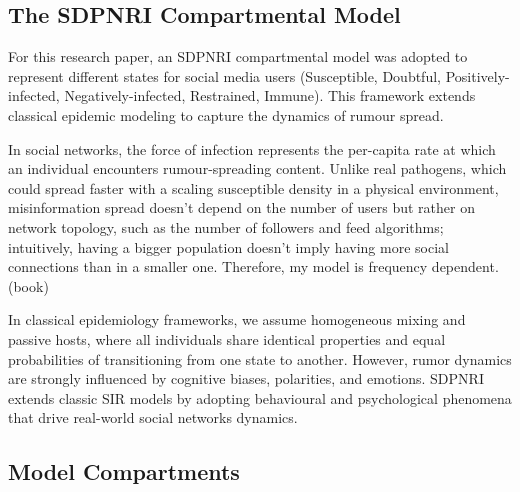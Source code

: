 \documentclass[11pt]{article}
\begin{document}
\subsection{The SDPNRI Compartmental Model}

For this research paper, an SDPNRI compartmental model was adopted to represent
different states for social media users (Susceptible, Doubtful, Positively-infected,
Negatively-infected, Restrained, Immune). This framework extends classical epidemic
modeling to capture the dynamics of rumour spread.

In social networks, the force of infection represents the per-capita rate at which an
individual encounters rumour-spreading content. Unlike real pathogens, which could
spread faster with a scaling susceptible density in a physical environment,
misinformation spread doesn't depend on the number of users but rather on network
topology, such as the number of followers and feed algorithms; intuitively, having a
bigger population doesn't imply having more social connections than in a smaller one.
Therefore, my model is frequency dependent. (book)

In classical epidemiology frameworks, we assume homogeneous mixing and passive hosts,
where all individuals share identical properties and equal probabilities of
transitioning from one state to another. However, rumor dynamics are strongly
influenced by cognitive biases, polarities, and emotions. SDPNRI extends classic SIR
models by adopting behavioural and psychological phenomena that drive real-world
social networks dynamics.

\subsection{Model Compartments}
\end{document}
